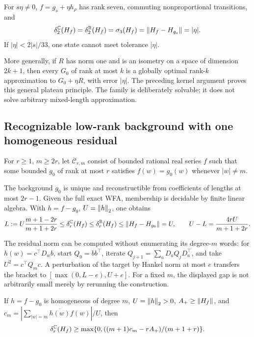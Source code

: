 \begin{theorem}\label{I:S:thm:mixedexact}
For $s\eta\ne0$, $f=g_s+\eta h_\rho$ has rank seven, commuting nonproportional transitions, and
\[
 \delta_2^\mathbb C(H_f)=\delta_2^\mathbb R(H_f)
  =\sigma_3(H_f)=\left\lVert H_f-H_{g_s}\right\rVert=|\eta|.
\]
If $|\eta|<2|s|/33$, one state cannot meet tolerance $|\eta|$.
\end{theorem}


More generally, if $R$ has norm one and is an isometry on a space of dimension $2k+1$, then every $G_0$ of rank at most $k$ is a globally optimal rank-$k$ approximation to $G_0+\eta R$, with error $|\eta|$. The preceding kernel argument proves this general plateau principle. The family is deliberately solvable; it does not solve arbitrary mixed-length approximation.

\subsection{Recognizable low-rank background with one homogeneous residual}
For $r\ge1$, $m\ge2r$, let $\mathcal C_{r,m}$ consist of bounded rational real series $f$ such that some bounded $g_0$ of rank at most $r$ satisfies $f(w)=g_0(w)$ whenever $|w|\ne m$.

\begin{theorem}\label{I:S:thm:constructgap}
The background $g_0$ is unique and reconstructible from coefficients of lengths at most $2r-1$. Given the full exact WFA, membership is decidable by finite linear algebra. With $h=f-g_0$, $U=\left\lVert h\right\rVert_2$, one obtains
\[
 L:=U\frac{m+1-2r}{m+1+2r}\le\delta_r^\mathbb C(H_f)
 \le\delta_r^\mathbb R(H_f)\le\left\lVert H_f-H_{g_0}\right\rVert=U,
 \qquad U-L=\frac{4rU}{m+1+2r}.
\]
\end{theorem}


The residual norm can be computed without enumerating its degree-$m$ words: for $h(w)=c^\top D_wb$, start $Q_0=bb^\top$, iterate $Q_{j+1}=\sum_aD_aQ_jD_a^\top$, and take $U^2=c^\top Q_mc$. A perturbation of the target by Hankel norm at most $e$ transfers the bracket to $[\max(0,L-e),U+e]$. For a fixed $m$, the displayed gap is not arbitrarily small merely by rerunning the construction.

\begin{proposition}\label{I:S:prop:directional}
If $h=f-g_0$ is homogeneous of degree $m$, $U=\left\lVert h\right\rVert_2>0$, $A_+\ge\left\lVert H_f\right\rVert$, and $c_m=|\sum_{|w|=m}\overline{h(w)}f(w)|/U$, then
\[
 \delta_r^\mathbb C(H_f)\ge
 \max\{0,((m+1)c_m-rA_+)/(m+1+r)\}.
\]
\end{proposition}


